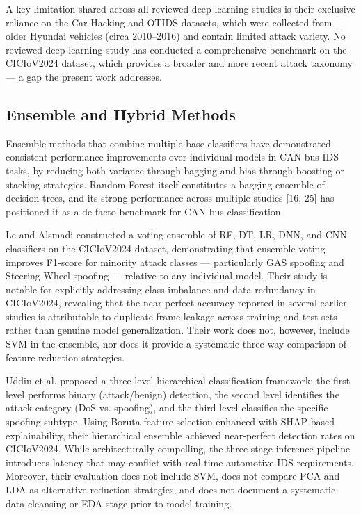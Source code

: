 \documentclass[conference]{IEEEtran}
\begin{document}
A key limitation shared across all reviewed deep learning studies is their exclusive reliance on the Car-Hacking and OTIDS datasets, which were collected from older Hyundai vehicles (circa 2010–2016) and contain limited attack variety. No reviewed deep learning study has conducted a comprehensive benchmark on the CICIoV2024 dataset, which provides a broader and more recent attack taxonomy — a gap the present work addresses.

\subsection{Ensemble and Hybrid Methods}

Ensemble methods that combine multiple base classifiers have demonstrated consistent performance improvements over individual models in CAN bus IDS tasks, by reducing both variance through bagging and bias through boosting or stacking strategies. Random Forest itself constitutes a bagging ensemble of decision trees, and its strong performance across multiple studies [16, 25] has positioned it as a de facto benchmark for CAN bus classification.

Le and Alsmadi \cite{article_emre} constructed a voting ensemble of RF, DT, LR, DNN, and CNN classifiers on the CICIoV2024 dataset, demonstrating that ensemble voting improves F1-score for minority attack classes — particularly GAS spoofing and Steering Wheel spoofing — relative to any individual model. Their study is notable for explicitly addressing class imbalance and data redundancy in CICIoV2024, revealing that the near-perfect accuracy reported in several earlier studies is attributable to duplicate frame leakage across training and test sets rather than genuine model generalization. Their work does not, however, include SVM in the ensemble, nor does it provide a systematic three-way comparison of feature reduction strategies.

Uddin et al. \cite{article_rai} proposed a three-level hierarchical classification framework: the first level performs binary (attack/benign) detection, the second level identifies the attack category (DoS vs. spoofing), and the third level classifies the specific spoofing subtype. Using Boruta feature selection enhanced with SHAP-based explainability, their hierarchical ensemble achieved near-perfect detection rates on CICIoV2024. While architecturally compelling, the three-stage inference pipeline introduces latency that may conflict with real-time automotive IDS requirements. Moreover, their evaluation does not include SVM, does not compare PCA and LDA as alternative reduction strategies, and does not document a systematic data cleansing or EDA stage prior to model training.
\end{document}
